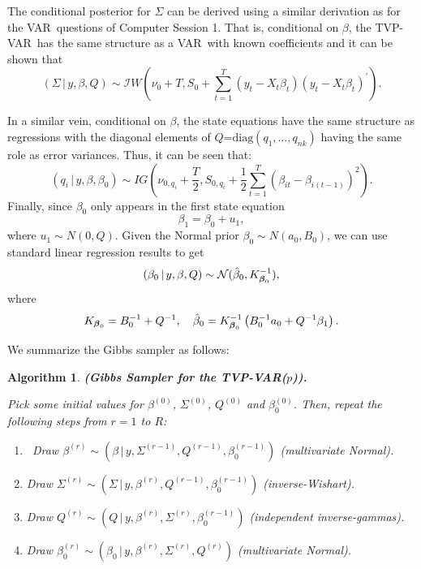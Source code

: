 \documentclass{article}
\newtheorem{algorithm}[theorem]{Algorithm}
\begin{document}
The conditional posterior for $\Sigma $ can be derived using a similar
derivation as for the VAR\ questions of Computer Session 1. That is,
conditional on $\beta $, the TVP-VAR\ has the same structure as a VAR\ with
known coefficients and it can be shown that 
\begin{equation*}
(\Sigma \,|\,y,\beta ,Q)\sim {\mathcal{I}W}\left( \nu
_{0}+T,S_{0}+\sum_{t=1}^{T}(y_{t}-X_{t}\beta _{t})(y_{t}-X_{t}\beta
_{t})^{\prime }\right) .
\end{equation*}

In a similar vein, conditional on $\beta $, the state equations have the
same structure as regressions with the diagonal elements of $Q$=$\text{diag}%
(q_{1},\ldots ,q_{nk})$ having the same role as error variances. Thus, it
can be seen that: 
\begin{equation*}
(q_{i}\,|\,y,\beta ,\beta _{0})\sim IG\left( \nu _{0,q_{i}}+\frac{T}{2}%
,S_{0,q_{i}}+\frac{1}{2}\sum_{t=1}^{T}(\beta _{it}-\beta
_{i(t-1)})^{2}\right) .
\end{equation*}%
Finally, since $\beta _{0}$ only appears in the first state equation 
\begin{equation*}
\beta _{1}=\beta _{0}+u_{1},
\end{equation*}%
where $u_{1}\sim N(0,Q)$. Given the Normal prior $\beta _{0}\sim
N(a_{0},B_{0})$, we can use standard linear regression results to get 
\begin{equation*}
(\beta _{0}\,|\,y,\beta ,Q)\sim {\mathcal{N}}(\hat{\beta}_{0},K_{\boldsymbol{%
\beta }_{0}}^{-1}),
\end{equation*}%
where 
\begin{equation*}
K_{\boldsymbol{\beta }_{0}}=B_{0}^{-1}+Q^{-1},\quad \hat{\beta}_{0}=K_{%
\boldsymbol{\beta }_{0}}^{-1}\left( B_{0}^{-1}a_{0}+Q^{-1}\beta _{1}\right) .
\end{equation*}

We summarize the Gibbs sampler as follows:

\begin{algorithm}
\textrm{\textbf{(Gibbs Sampler for the TVP-VAR($p$)).} }

\textrm{Pick some initial values for} $\beta ^{(0)}$, $\Sigma ^{(0)}$, $%
Q^{(0)}$ and $\beta _{0}^{(0)}$. Th\textrm{en, repeat the following steps
from $r=1$ to $R$: }

\begin{enumerate}
\item \ Draw $\beta ^{(r)}\sim (\beta \,|\,y,\Sigma ^{(r-1)},Q^{(r-1)},\beta
_{0}^{(r-1)})$ (multivariate Normal).

\item Draw $\Sigma ^{(r)}\sim (\Sigma \,|\,y,\beta ^{(r)},Q^{(r-1)},\beta
_{0}^{(r-1)})$ (inverse-Wishart).

\item Draw $Q^{(r)}\sim (Q\,|\,y,\beta ^{(r)},\Sigma ^{(r)},\beta
_{0}^{(r-1)})$ (independent inverse-gammas).

\item Draw $\beta _{0}^{(r)}\sim (\beta _{0}\,|\,y,\beta ^{(r)},\Sigma
^{(r)},Q^{(r)})$ (multivariate Normal)\textrm{. }
\end{enumerate}
\end{algorithm}
\end{document}
